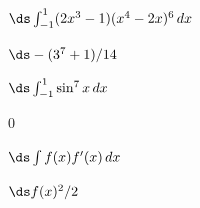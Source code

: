 \begin{enumialphparenastyle}
\begin{ex}
 $\ds\int_{-1}^1 (2x^3-1)(x^4-2x)^6\,dx$
\begin{sol}
 $\ds -(3^7+1)/14$
\end{sol}
\end{ex}

\begin{ex}
 $\ds\int_{-1}^1 \sin^7 x\,dx$
\begin{sol}
 $0$
\end{sol}
\end{ex}

\begin{ex}
 $\ds\int f(x) f'(x)\,dx$ 
\begin{sol}
 $\ds f(x)^2/2$
\end{sol}
\end{ex}

\end{enumialphparenastyle}